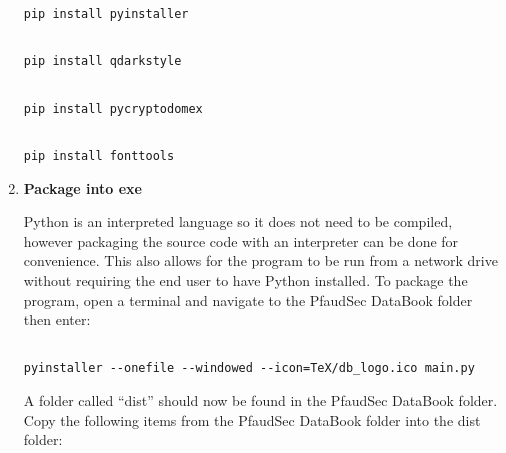\documentclass[14pt]{article}
\begin{document}
\begin{flushleft}
\begin{enumerate}
\begin{tcolorbox}[boxrule=0.5pt, colback=backgrey, colframe=bordergrey, sharpish corners]
\begin{verbatim}
pip install pyinstaller

\end{verbatim}
\end{tcolorbox}

\begin{tcolorbox}[boxrule=0.5pt, colback=backgrey, colframe=bordergrey, sharpish corners] 
\begin{verbatim}

pip install qdarkstyle

\end{verbatim}
\end{tcolorbox}


\begin{tcolorbox}[boxrule=0.5pt, colback=backgrey, colframe=bordergrey, sharpish corners] 
\begin{verbatim}

pip install pycryptodomex

\end{verbatim}
\end{tcolorbox}


\begin{tcolorbox}[boxrule=0.5pt, colback=backgrey, colframe=bordergrey, sharpish corners] 
\begin{verbatim}

pip install fonttools

\end{verbatim}
\end{tcolorbox}

\item \textbf{Package into exe}

Python is an interpreted language so it does not need to be compiled, however packaging the source code with an interpreter can be done for convenience.
This also allows for the program to be run from a network drive without requiring the end user to have Python installed.
To package the program, open a terminal and navigate to the PfaudSec DataBook folder then enter:

\begin{tcolorbox}[boxrule=0.5pt, colback=backgrey, colframe=bordergrey, sharpish corners] 
\begin{verbatim}

pyinstaller --onefile --windowed --icon=TeX/db_logo.ico main.py

\end{verbatim}
\end{tcolorbox}

A folder called ``dist'' should now be found in the PfaudSec DataBook folder.
Copy the following items from the PfaudSec DataBook folder into the dist folder:


\end{enumerate}
\end{flushleft}
\end{document}
